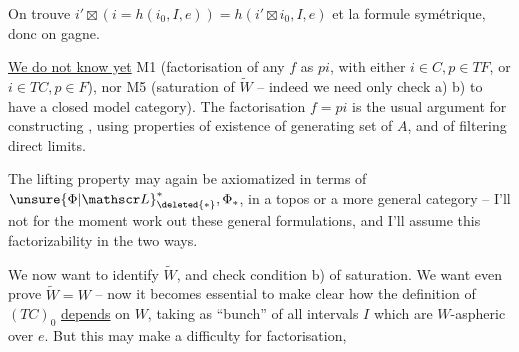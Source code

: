 



On trouve $i'\boxtimes(i=h(i_0,I,e))=h(i'\boxtimes i_0,I,e)$ et la formule symétrique, donc on gagne.


\uline{We do not know yet} M1 (factorisation of any $f$ as $pi$, with either $i\in C,p\in TF$, or $i\in TC,p\in F$), nor M5 (saturation of $\widetilde W$ -- indeed we need only check a) b) to have a closed model category). The factorisation $f=pi$ is the usual argument for constructing , using  properties of existence of  generating set of $A$, and of filtering direct limits.

The lifting property may again be axiomatized in terms of $\unsure{\Phi|\mathscr L}^{*}_{\deleted{*}},\Phi_{*}$, in a topos or a more general category -- I'll not for the moment work out these general formulations, and  I'll assume this factorizability  in the two ways.


We now want to identify $\widetilde W$, and check condition b) of saturation. We want even prove $\widetilde W=W$ -- now it becomes essential to  make clear how the definition of $(TC)_0$ \uline{depends} on $W$, taking as ``bunch'' of  all intervals $I$ which are $W$-aspheric over $e$. But this may make a difficulty for factorisation,


